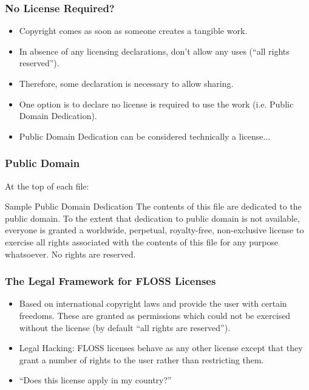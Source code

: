 
\begin{frame}
\frametitle{No License Required?}

\begin{itemize}
\item Copyright comes as soon as someone creates a tangible work.
\item In absence of any licensing declarations, don't allow any uses (``all rights reserved'').
\item Therefore, some declaration is necessary to allow sharing.
\item One option is to declare no license is required to use the work (i.e. Public Domain Dedication). 
\item Public Domain Dedication can be considered technically a license...
\end{itemize}

\end{frame}


\begin{frame}
\frametitle{Public Domain}

At the top of each file:
\begin{block}{Sample Public Domain Dedication}
The contents of this file are dedicated to the public domain. To the extent that dedication to public domain is not available, everyone is granted a worldwide, perpetual, royalty-free, non-exclusive license to exercise all rights associated with the contents of this file for any purpose whatsoever. No rights are reserved.
\end{block}

\end{frame}

\begin{frame}
\frametitle{The Legal Framework for FLOSS Licenses}
\begin{itemize}
\item Based on international copyright laws and provide the user with certain freedoms. These are granted as permissions which \alert{could not be exercised} without the license (by default ``all rights are reserved'').
\item \alert{Legal Hacking:} FLOSS licenses behave as any other license except that they grant a number of rights to the user rather than restricting them. 
\item ``Does this license apply in my country?''
\end{itemize}


\end{frame}

